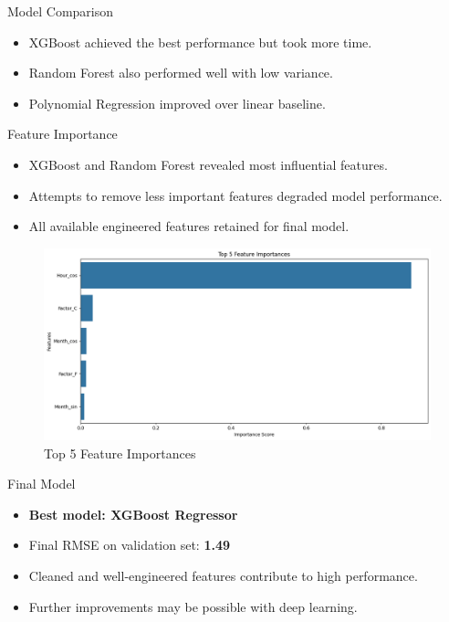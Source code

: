 \documentclass{beamer}
\begin{document}
\begin{frame}{Model Comparison}
  \begin{itemize}
    \item XGBoost achieved the best performance but took more time.
    \item Random Forest also performed well with low variance.
    \item Polynomial Regression improved over linear baseline.
  \end{itemize}
\end{frame}

\begin{frame}{Feature Importance}
\begin{itemize}
    \item XGBoost and Random Forest revealed most influential features.
    \item Attempts to remove less important features degraded model performance.
    \item All available engineered features retained for final model.
\end{itemize}
  \begin{figure}
\vfill
    \centering
    \includegraphics[width=0.6\linewidth]{images/fi_xgb.png}
    \caption{Top 5 Feature Importances}
    \label{fig:enter-label}
\end{figure}
\end{frame}

\begin{frame}{Final Model}
\begin{itemize}
    \item \textbf{Best model: XGBoost Regressor}
    \item Final RMSE on validation set: \textbf{1.49}
    \item Cleaned and well-engineered features contribute to high performance.
    \item Further improvements may be possible with deep learning.
\end{itemize}
\end{frame}
\end{document}
